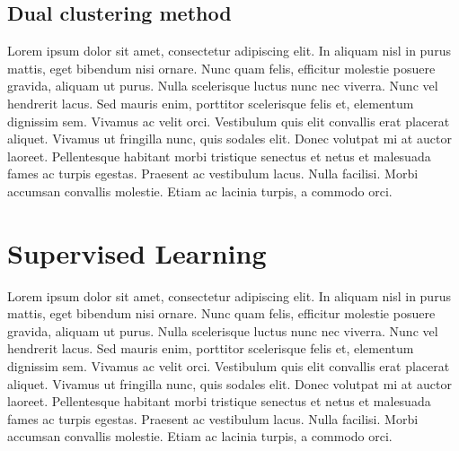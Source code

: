 \subsection{Dual clustering method}\label{sec:3.3.6}
\vspace{-0.5cm}
\noindent  Lorem ipsum dolor sit amet, consectetur adipiscing elit. In aliquam nisl in purus mattis, eget bibendum nisi ornare. Nunc quam felis, efficitur molestie posuere gravida, aliquam ut purus. Nulla scelerisque luctus nunc nec viverra. Nunc vel hendrerit lacus. Sed mauris enim, porttitor scelerisque felis et, elementum dignissim sem. Vivamus ac velit orci. Vestibulum quis elit convallis erat placerat aliquet. Vivamus ut fringilla nunc, quis sodales elit. Donec volutpat mi at auctor laoreet. Pellentesque habitant morbi tristique senectus et netus et malesuada fames ac turpis egestas. Praesent ac vestibulum lacus. Nulla facilisi. Morbi accumsan convallis molestie. Etiam ac lacinia turpis, a commodo orci.

\vspace{-0.3cm}




\section{Supervised Learning}\label{sec:3.4}
\vspace{-0.5cm}
\noindent Lorem ipsum dolor sit amet, consectetur adipiscing elit. In aliquam nisl in purus mattis, eget bibendum nisi ornare. Nunc quam felis, efficitur molestie posuere gravida, aliquam ut purus. Nulla scelerisque luctus nunc nec viverra. Nunc vel hendrerit lacus. Sed mauris enim, porttitor scelerisque felis et, elementum dignissim sem. Vivamus ac velit orci. Vestibulum quis elit convallis erat placerat aliquet. Vivamus ut fringilla nunc, quis sodales elit. Donec volutpat mi at auctor laoreet. Pellentesque habitant morbi tristique senectus et netus et malesuada fames ac turpis egestas. Praesent ac vestibulum lacus. Nulla facilisi. Morbi accumsan convallis molestie. Etiam ac lacinia turpis, a commodo orci.

\vspace{-0.3cm}




